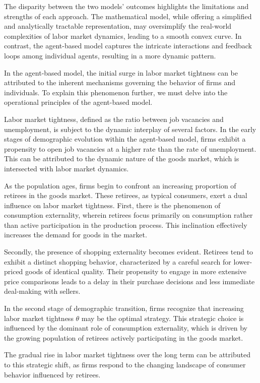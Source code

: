\documentclass[ %
    final,
    scrbook,
    listoffigures,
    listoftables, 
    glossary]{cu-thesis}
\begin{document}
The disparity between the two models' outcomes highlights the limitations and strengths of each approach. The mathematical model, while offering a simplified and analytically tractable representation, may oversimplify the real-world complexities of labor market dynamics, leading to a smooth convex curve. In contrast, the agent-based model captures the intricate interactions and feedback loops among individual agents, resulting in a more dynamic pattern. 

In the agent-based model, the initial surge in labor market tightness can be attributed to the inherent mechanisms governing the behavior of firms and individuals. To explain this phenomenon further, we must delve into the operational principles of the agent-based model.

Labor market tightness, defined as the ratio between job vacancies and unemployment, is subject to the dynamic interplay of several factors. In the early stages of demographic evolution within the agent-based model, firms exhibit a propensity to open job vacancies at a higher rate than the rate of unemployment. This can be attributed to the dynamic nature of the goods market, which is intersected with labor market dynamics.

As the population ages, firms begin to confront an increasing proportion of retirees in the goods market. These retirees, as typical consumers, exert a dual influence on labor market tightness. First, there is the phenomenon of consumption externality, wherein retirees focus primarily on consumption rather than active participation in the production process. This inclination effectively increases the demand for goods in the market.

Secondly, the presence of shopping externality becomes evident. Retirees tend to exhibit a distinct shopping behavior, characterized by a careful search for lower-priced goods of identical quality. Their propensity to engage in more extensive price comparisons leads to a delay in their purchase decisions and less immediate deal-making with sellers.

In the second stage of demographic transition, firms recognize that increasing labor market tightness $\theta$ may be the optimal strategy. This strategic choice is influenced by the dominant role of consumption externality, which is driven by the growing population of retirees actively participating in the goods market.

The gradual rise in labor market tightness over the long term can be attributed to this strategic shift, as firms respond to the changing landscape of consumer behavior influenced by retirees.
\end{document}
